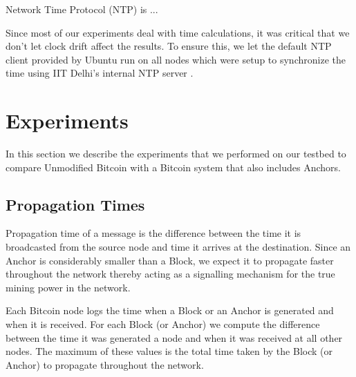Network Time Protocol (NTP) is ... 

Since most of our experiments deal with time calculations, it was critical that we don't let clock drift affect the results. 
To ensure this, we let the default NTP client provided by Ubuntu run on all nodes which were setup to synchronize the time using IIT Delhi's internal NTP server \cite{iitdNTP}.


\newpage

\section{Experiments} \label{exp-exp}

In this section we describe the experiments that we performed on our testbed to compare Unmodified Bitcoin with a Bitcoin system that also includes Anchors.


\subsection{Propagation Times} \label{exp-prop}

Propagation time of a message is the difference between the time it is broadcasted from the source node and time it arrives at the destination. 
Since an Anchor is considerably smaller than a Block, we expect it to propagate faster throughout the network thereby acting as a signalling mechanism for the true mining power in the network.

Each Bitcoin node logs the time when a Block or an Anchor is generated and when it is received. 
For each Block (or Anchor) we compute the difference between the time it was generated a node and when it was received at all other nodes. The maximum of these values is the total time taken by the Block (or Anchor) to propagate throughout the network.



